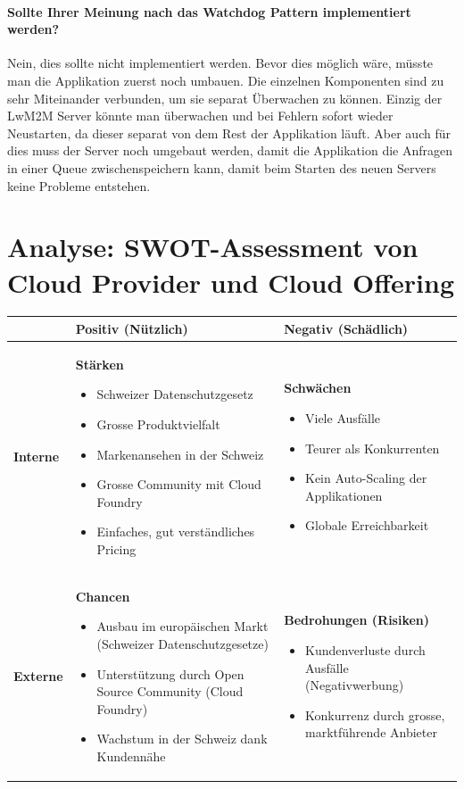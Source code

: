 \subsubsection{Sollte Ihrer Meinung nach das Watchdog Pattern implementiert werden?}
Nein, dies sollte nicht implementiert werden. Bevor dies möglich wäre, müsste man die Applikation zuerst noch umbauen. Die einzelnen Komponenten sind zu sehr Miteinander verbunden, um sie separat Überwachen zu können. Einzig der LwM2M Server könnte man überwachen und bei Fehlern sofort wieder Neustarten, da dieser separat von dem Rest der Applikation läuft. Aber auch für dies muss der Server noch umgebaut werden, damit die Applikation die Anfragen in einer Queue zwischenspeichern kann, damit beim Starten des neuen Servers keine Probleme entstehen.
\chapter{Analyse: SWOT-Assessment von Cloud Provider und Cloud Offering}
\begin{table}[H]
\begin{tabular}{|l|p{}|p{}|}
\hline 
 & \textbf{Positiv (Nützlich)}  & \textbf{Negativ (Schädlich)} \\ \hline 
\textbf{Interne} & \textbf{Stärken} 
\begin{itemize}
\item Schweizer Datenschutzgesetz
\item Grosse Produktvielfalt
\item Markenansehen in der Schweiz
\item Grosse Community mit Cloud Foundry
\item Einfaches, gut verständliches Pricing
\end{itemize}

& \textbf{Schwächen}
\begin{itemize}
\item Viele Ausfälle
\item Teurer als Konkurrenten
\item Kein Auto-Scaling der Applikationen
\item Globale Erreichbarkeit
\end{itemize}
\\ \hline 
\textbf{Externe} & \textbf{Chancen} 
\begin{itemize}
\item Ausbau im europäischen Markt (Schweizer Datenschutzgesetze)
\item Unterstützung durch Open Source Community (Cloud Foundry)
\item Wachstum in der Schweiz dank Kundennähe
\end{itemize}&
\textbf{Bedrohungen (Risiken)} 
 \begin{itemize}
\item Kundenverluste durch Ausfälle (Negativwerbung)
\item Konkurrenz durch grosse, marktführende Anbieter
\end{itemize}
\\ \hline 
\end{tabular} 
\end{table}

